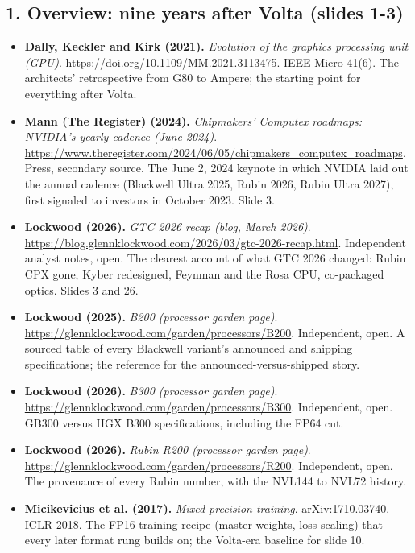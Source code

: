 \documentclass[11pt,letterpaper]{article}
\begin{document}
\subsection*{1. Overview: nine years after Volta (slides 1-3)}
\begin{itemize}[leftmargin=1.2em,itemsep=3pt]\sloppy
\item \textbf{Dally, Keckler and Kirk (2021).} \textit{Evolution of the graphics processing unit (GPU)}. \url{https://doi.org/10.1109/MM.2021.3113475}. IEEE Micro 41(6). The architects' retrospective from G80 to Ampere; the starting point for everything after Volta.
\item \textbf{Mann (The Register) (2024).} \textit{Chipmakers' Computex roadmaps: NVIDIA's yearly cadence (June 2024)}. \url{https://www.theregister.com/2024/06/05/chipmakers_computex_roadmaps}. Press, secondary source. The June 2, 2024 keynote in which NVIDIA laid out the annual cadence (Blackwell Ultra 2025, Rubin 2026, Rubin Ultra 2027), first signaled to investors in October 2023. Slide 3.
\item \textbf{Lockwood (2026).} \textit{GTC 2026 recap (blog, March 2026)}. \url{https://blog.glennklockwood.com/2026/03/gtc-2026-recap.html}. Independent analyst notes, open. The clearest account of what GTC 2026 changed: Rubin CPX gone, Kyber redesigned, Feynman and the Rosa CPU, co-packaged optics. Slides 3 and 26.
\item \textbf{Lockwood (2025).} \textit{B200 (processor garden page)}. \url{https://glennklockwood.com/garden/processors/B200}. Independent, open. A sourced table of every Blackwell variant's announced and shipping specifications; the reference for the announced-versus-shipped story.
\item \textbf{Lockwood (2026).} \textit{B300 (processor garden page)}. \url{https://glennklockwood.com/garden/processors/B300}. Independent, open. GB300 versus HGX B300 specifications, including the FP64 cut.
\item \textbf{Lockwood (2026).} \textit{Rubin R200 (processor garden page)}. \url{https://glennklockwood.com/garden/processors/R200}. Independent, open. The provenance of every Rubin number, with the NVL144 to NVL72 history.
\item \textbf{Micikevicius et al. (2017).} \textit{Mixed precision training}. arXiv:1710.03740. ICLR 2018. The FP16 training recipe (master weights, loss scaling) that every later format rung builds on; the Volta-era baseline for slide 10.
\end{itemize}
\end{document}
